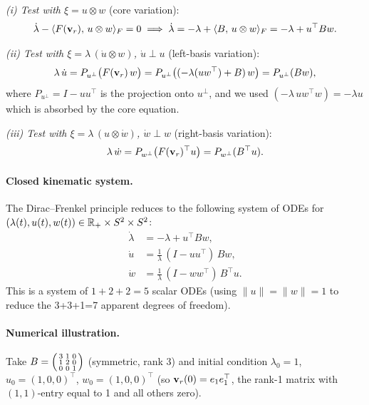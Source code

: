 \begin{example}
\medskip
\noindent\textit{(i) Test with $\xi = u \otimes w$} (core variation):
\begin{equation}
    \dot\lambda - \langle F(\mathbf{v}_r),\, u \otimes w\rangle_F = 0
    \implies
    \dot\lambda = -\lambda + \langle B,\, u \otimes w\rangle_F
    = -\lambda + u^\top B w.
\end{equation}

\noindent\textit{(ii) Test with $\xi = \lambda\,(\dot u \otimes w)$,
$\dot u \perp u$} (left-basis variation):
\begin{equation}
    \lambda\,\dot u
    = P_{u^\perp}\bigl(F(\mathbf{v}_r)\,w\bigr)
    = P_{u^\perp}\bigl((-\lambda(uw^\top) + B)\,w\bigr)
    = P_{u^\perp}(Bw),
\end{equation}
where $P_{u^\perp} = I - uu^\top$ is the projection onto $u^\perp$,
and we used $(-\lambda\,u w^\top w) = -\lambda u$ which is absorbed
by the core equation.

\noindent\textit{(iii) Test with $\xi = \lambda\,(u \otimes \dot w)$,
$\dot w \perp w$} (right-basis variation):
\begin{equation}
    \lambda\,\dot w
    = P_{w^\perp}\bigl(F(\mathbf{v}_r)^\top u\bigr)
    = P_{w^\perp}(B^\top u).
\end{equation}

\paragraph{Closed kinematic system.}
The Dirac--Frenkel principle reduces to the following system of ODEs
for $(\lambda(t), u(t), w(t)) \in \mathbb{R}_+ \times S^2 \times S^2$:
\begin{subequations}
\label{eq:DF:fd_system}
\begin{align}
    \dot\lambda &= -\lambda + u^\top B w,
    \label{eq:DF:fd_lambda}\\
    \dot u &= \frac{1}{\lambda}\,(I - uu^\top)\,Bw,
    \label{eq:DF:fd_u}\\
    \dot w &= \frac{1}{\lambda}\,(I - ww^\top)\,B^\top u.
    \label{eq:DF:fd_w}
\end{align}
\end{subequations}
This is a system of $1 + 2 + 2 = 5$ scalar ODEs (using $\|u\|=\|w\|=1$
to reduce the 3+3+1=7 apparent degrees of freedom).

\paragraph{Numerical illustration.}
Take $B = \begin{psmallmatrix} 3 & 1 & 0 \\ 1 & 2 & 0 \\ 0 & 0 & 1
\end{psmallmatrix}$ (symmetric, rank 3) and initial condition
$\lambda_0 = 1$, $u_0 = (1,0,0)^\top$, $w_0 = (1,0,0)^\top$
(so $\mathbf{v}_r(0) = e_1 e_1^\top$, the rank-1 matrix with $(1,1)$-entry
equal to 1 and all others zero).


\end{example}
